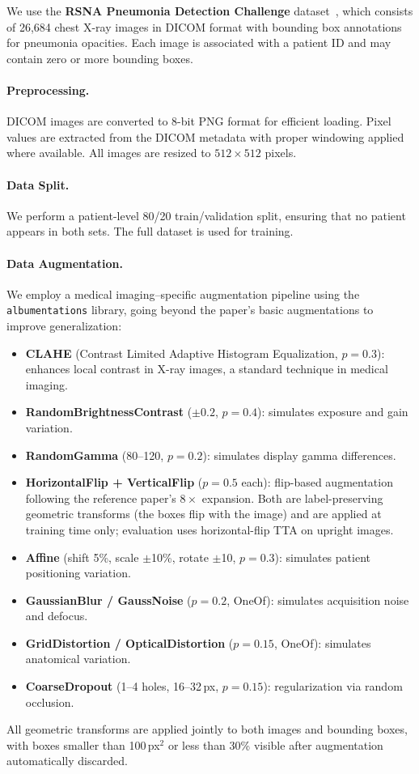 \documentclass[11pt,a4paper]{article}
\begin{document}
We use the \textbf{RSNA Pneumonia Detection Challenge} dataset~\cite{shih2019rsna}, which consists of 26,684 chest X-ray images in DICOM format with bounding box annotations for pneumonia opacities. Each image is associated with a patient ID and may contain zero or more bounding boxes.

\paragraph{Preprocessing.}
DICOM images are converted to 8-bit PNG format for efficient loading. Pixel values are extracted from the DICOM metadata with proper windowing applied where available. All images are resized to $512 \times 512$ pixels.

\paragraph{Data Split.}
We perform a patient-level 80/20 train/validation split, ensuring that no patient appears in both sets. The full dataset is used for training.

\paragraph{Data Augmentation.}
We employ a medical imaging--specific augmentation pipeline using the \texttt{albumentations} library, going beyond the paper's basic augmentations to improve generalization:
\begin{itemize}[nosep]
    \item \textbf{CLAHE} (Contrast Limited Adaptive Histogram Equalization, $p=0.3$): enhances local contrast in X-ray images, a standard technique in medical imaging.
    \item \textbf{RandomBrightnessContrast} ($\pm 0.2$, $p=0.4$): simulates exposure and gain variation.
    \item \textbf{RandomGamma} (80--120, $p=0.2$): simulates display gamma differences.
    \item \textbf{HorizontalFlip + VerticalFlip} ($p=0.5$ each): flip-based augmentation following the reference paper's $8\times$ expansion. Both are label-preserving geometric transforms (the boxes flip with the image) and are applied at training time only; evaluation uses horizontal-flip TTA on upright images.
    \item \textbf{Affine} (shift 5\%, scale $\pm$10\%, rotate $\pm$10\textdegree, $p=0.3$): simulates patient positioning variation.
    \item \textbf{GaussianBlur / GaussNoise} ($p=0.2$, OneOf): simulates acquisition noise and defocus.
    \item \textbf{GridDistortion / OpticalDistortion} ($p=0.15$, OneOf): simulates anatomical variation.
    \item \textbf{CoarseDropout} (1--4 holes, 16--32\,px, $p=0.15$): regularization via random occlusion.
\end{itemize}
All geometric transforms are applied jointly to both images and bounding boxes, with boxes smaller than 100\,px$^2$ or less than 30\% visible after augmentation automatically discarded.
\end{document}
